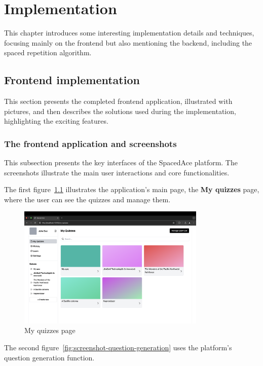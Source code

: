 \chapter{Implementation}\label{ch:implementation}

This chapter introduces some interesting implementation details and techniques, focusing mainly on the frontend but also mentioning the backend, including the spaced repetition algorithm.


\section{Frontend implementation}

This section presents the completed frontend application, illustrated with pictures, and then describes the solutions used during the implementation, highlighting the exciting features.

\subsection{The frontend application and screenshots}

This subsection presents the key interfaces of the SpacedAce platform. The screenshots illustrate the main user interactions and core functionalities.

The first figure~\ref{fig:screenshot-quizzes} illustrates the application's main page, the \textbf{My quizzes} page, where the user can see the quizzes and manage them.

\begin{figure}[H]
	\centering
	\includegraphics[width=0.8\textwidth, keepaspectratio]{figures/screenshot-quizzes.png}
	\caption{My quizzes page}
	\label{fig:screenshot-quizzes}
\end{figure}

The second figure~\ref {fig:screenshot-question-generation} uses the platform's question generation function.

